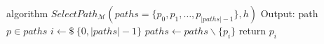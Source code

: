 \begin{Pseudocode}[float, caption={
Random Path Selection Strategy.
}, label={alg:select-path-rnd}]
algorithm $SelectPath_{\mathcal{M}}(paths = \{ p_0, p_1, \dots, p_{|paths|-1} \}, h)$
	Output: path $p \in paths$
	$i \leftarrow\$~ \{0, |paths|-1\}$
	$paths \leftarrow paths \backslash \{ p_i \}$
	return $p_i$
\end{Pseudocode}


